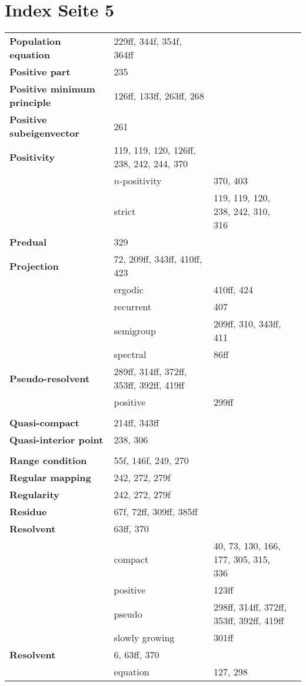 \documentclass[10pt]{scrartcl}
\begin{document}
\pagestyle{empty}
\section*{Index Seite 5 }
\begin{longtable}{>{\bfseries}p{4cm}p{4cm}p{4cm}p{4cm}}

Population equation 	& 229ff, 344f, 354f, 364ff \\
Positive part 	& 235 \\
Positive minimum principle 	& 126ff, 133ff, 263ff, 268 \\
Positive subeigenvector 	& 261 \\
Positivity 	& 119, 119, 120, 126ff, 238, 242, 244, 370 \\
	& $n$-positivity 	& 370, 403 \\
	& strict 	& 119, 119, 120, 238, 242, 310, 316 \\
Predual 	& 329 \\
Projection 	& 72, 209ff, 343ff, 410ff, 423 \\
	& ergodic 	& 410ff, 424 \\
	& recurrent 	& 407 \\
	& semigroup 	& 209ff, 310, 343ff, 411 \\
	& spectral 	& 86ff \\
Pseudo-resolvent 	& 289ff, 314ff, 372ff, 353ff, 392ff, 419ff \\
	& positive 	& 299ff \\
	& \\
Quasi-compact 	& 214ff, 343ff \\
Quasi-interior point 	& 238, 306 \\
	& \\
Range condition 	& 55f, 146f, 249, 270 \\
Regular mapping 	& 242, 272, 279f \\
Regularity 	& 242, 272, 279f \\
Residue 	& 67f, 72ff, 309ff, 385ff \\
Resolvent 	& 63ff, 370 \\
	& compact 	& 40, 73, 130, 166, 177, 305, 315, 336 \\
	& positive 	& 123ff \\
	& pseudo 	& 298ff, 314ff, 372ff, 353ff, 392ff, 419ff \\
	& slowly growing 	& 301ff \\
Resolvent 	& 6, 63ff, 370 \\
	& equation 	& 127, 298 \\

\end{longtable}
\end{document}
